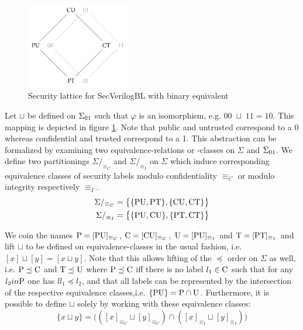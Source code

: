 \begin{figure}
    \centering
    \includegraphics[width=0.4\textwidth]{figures/binary-lattice.png}
    \caption{Security lattice for SecVerilogBL \cite{Ferraiuolo17} with binary equivalent}
    \label{fig:sec-lattice-bin}
\end{figure}

Let $ \sqcup $ be defined on $ \binSigma $ such that $ \varphi $ is an isomorphism, e.g. $ 00 \; \sqcup \; 11 = 10 $.
This mapping is depicted in figure \ref{fig:sec-lattice-bin}.
Note that public and untrusted correspond to a 0 whereas confidential and trusted correspond to a 1.
This abstraction can be formalized by examining two equivalence-relations or -classes on $ \Sigma $ and $ \binSigma $.
We define two partitionings $ \Sigma/_{\equiv_C} $ and $ \Sigma/_{\equiv_I} $ on $ \Sigma $ which induce corresponding equivalence classes of security labels modulo confidentiality $ \equiv_C $ or modulo integrity respectively $ \equiv_I $.
\begin{align*}
    \Sigma /_{\equiv_C} &= \big\{ \{ \PU, \PT \}, \{ \CU, \CT \} \big\} \\
    \Sigma /_{\equiv_I} &= \big\{ \{ \PU, \CU \}, \{ \PT, \CT \} \big\}
\end{align*}

We coin the names $ \P = [\PU]_{\equiv_C} $, $ \C = [\CU]_{\equiv_C} $, $ \U = [\PU]_{\equiv_I} $ and $ \T = [\PT]_{\equiv_I} $ and lift $ \sqcup $ to be defined on equivalence-classes in the usual fashion, i.e. $ [x] \sqcup [y] = [x \sqcup y] $.
Note that this allows lifting of the $ \preceq $ order on $ \Sigma $ as well, i.e. $ \P \preceq \C $ and $ \T \preceq \U $ where $ \P \preceq \C $ iff there is no label $ l_1 \in \C $ such that for any $ l_2 in \P $ one has $ l l_1 \preceq l_2 $, and that all labels can be represented by the intersection of the respective equivalence classes,i.e. $ \{ \PU \} = \P \cap \U $.
Furthermore, it is possible to define $ \sqcup $ solely by working with these equivalence classes:
\begin{equation*}
    \{ x \sqcup y \} = \big(([x]_{\equiv_C} \sqcup [y]_{\equiv_C}) \cap ([x]_{\equiv_I} \sqcup [y]_{\equiv_I}) \big)
\end{equation*}

